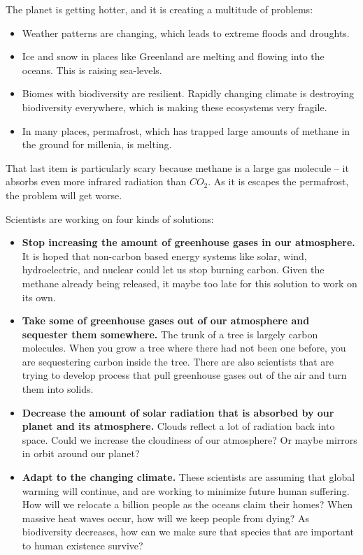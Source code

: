 The planet is getting hotter, and it is creating a multitude of
problems:
\begin{itemize}
\item Weather patterns are changing, which leads to extreme floods and
  droughts.
  
\item Ice and snow in places like Greenland are melting and flowing
  into the oceans. This is raising sea-levels.
  
\item Biomes with biodiversity are resilient. Rapidly changing climate
  is destroying biodiversity everywhere, which is making these ecosystems
  very fragile.
  
\item In many places, permafrost, which has trapped large amounts of
  methane in the ground for millenia, is melting.
\end{itemize}

That last item is particularly scary because methane is a large gas
molecule -- it absorbs even more infrared radiation than $CO_2$. As it is
escapes the permafrost, the problem will get worse.

Scientists are working on four kinds of solutions:
\begin{itemize}
  \item \textbf{Stop increasing the amount of greenhouse gases in our
    atmosphere.} It is hoped that non-carbon based energy systems like
    solar, wind, hydroelectric, and nuclear could let us stop burning
    carbon. Given the methane already being released, it maybe too
    late for this solution to work on its own.

  \item \textbf{Take some of greenhouse gases out of our atmosphere and
    sequester them somewhere.} The trunk of a tree is largely carbon
    molecules. When you grow a tree where there had not been one
    before, you are sequestering carbon inside the tree.  There are
    also scientists that are trying to develop process that pull
    greenhouse gases out of the air and turn them into solids.

  \item \textbf{Decrease the amount of solar radiation that is
    absorbed by our planet and its atmosphere.} Clouds reflect a lot of radiation back into
    space. Could we increase the cloudiness of our atmosphere? Or
    maybe  mirrors in orbit around our planet?

  \item \textbf{Adapt to the changing climate.} These scientists are
    assuming that global warming will continue, and are working to
    minimize future human suffering. How will we relocate a billion
    people as the oceans claim their homes?  When massive heat waves
    occur, how will we keep people from dying?  As biodiversity
    decreases, how can we make sure that species that are important to
    human existence survive?
    
\end{itemize}

